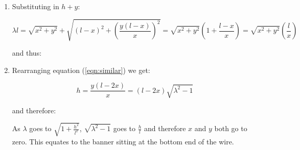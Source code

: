 \begin{problem}
{\begin{enumerate}
	Resolving forces horizontally $T \cos\alpha = T \cos\beta$ and therefore $\alpha = \beta$
	
	Thus we have two similar triangles, one with sides $x$ and $y$ and one with sides $l - x$  and  $h + y$., obeying:
	
	\begin{equation}	\frac{x}{y} = \frac{l - x}{h + y}	
	\label{eqn:similar}
	\end{equation}
	
	and we know total length of wire is $\lambda l$ therefore:
	
	\begin{equation}	\lambda l = \sqrt{x^{2} + y^{2}} + \sqrt{{(l - x)}^{2} + {(h + y)}^{2}}  \end{equation}
	
	 \item Substituting in $h + y$:
	 
	 \begin{equation*}	\lambda l = \sqrt{x^{2} + y^{2}} + \sqrt{{(l - x)}^{2} + \left({\frac{y(l-x)}{x}}\right)^{2}} 
	 = \sqrt{x^{2} + y^{2}} \left( 1 + \frac{l-x}{x} \right)
	 = \sqrt{x^{2} + y^{2}} \left(\frac{l}{x} \right)\end{equation*}
	 
	 and thus:
	 
	 
	 \item Rearranging equation (\ref{eqn:similar}) we get:
	 
	  \begin{equation*}	h = \frac{y(l - 2x)}{x} =  (l - 2x)\sqrt{\lambda^2 - 1}   \end{equation*}
	  
	  and therefore:
	  
	   
	   As $\lambda$ goes to $\sqrt{1 + \frac{h^2}{l^2}}$, $\sqrt{\lambda^2 -1}$ goes to $\frac{h}{l}$ and therefore $x$ and $y$ both go to zero. This equates to the banner sitting at the bottom end of the wire.
	   

\end{enumerate}}
\end{problem}
